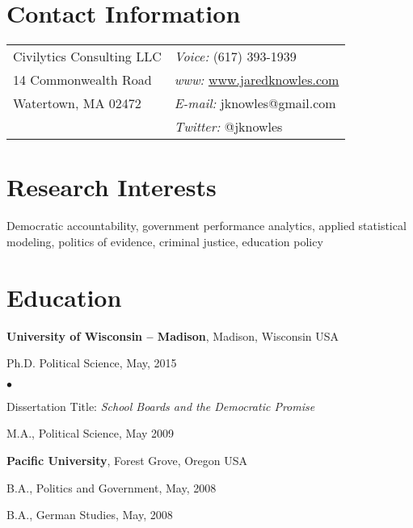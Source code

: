 \documentclass[margin,line]{res}
\newenvironment{list1}{
  \begin{list}{\ding{113}}{%
      \setlength{\itemsep}{0in}
      \setlength{\parsep}{0in} \setlength{\parskip}{0in}
      \setlength{\topsep}{0in} \setlength{\partopsep}{0in} 
      \setlength{\leftmargin}{0.17in}}}{\end{list}}
\newenvironment{list2}{
  \begin{list}{$\bullet$}{%
      \setlength{\itemsep}{0in}
      \setlength{\parsep}{0in} \setlength{\parskip}{0in}
      \setlength{\topsep}{0in} \setlength{\partopsep}{0in} 
      \setlength{\leftmargin}{0.2in}}}{\end{list}}
\begin{document}

\begin{resume}
\section{\sc Contact Information}
\vspace{.05in}
\begin{tabular}{@{}p{2.75in}p{2.75in}}
Civilytics Consulting LLC & {\it Voice:}  (617) 393-1939 \\            
14 Commonwealth Road & {\it www:} \url{www.jaredknowles.com} \\           
Watertown, MA 02472 & {\it E-mail:}  jknowles@gmail.com\\       
 & {\it Twitter:} @jknowles      \\   
\end{tabular}

\section{\sc Research Interests}
Democratic accountability, government performance analytics, applied statistical 
modeling, politics of evidence, criminal justice, education policy

\section{\sc Education}
{\bf University of Wisconsin -- Madison}, Madison, Wisconsin USA\\
\vspace*{-.1in}
\begin{list1}
\item[] Ph.D. Political Science, May, 2015
\begin{list2}
\vspace*{.05in}
\item Dissertation Title: \emph {School Boards and the Democratic Promise} 
\end{list2}
\vspace*{.05in}
\item[] M.A., Political Science,  May 2009
\end{list1}

{\bf Pacific University}, Forest Grove, Oregon USA\\
\vspace*{-.1in}
\begin{list1}
\item[] B.A., Politics and Government,  May, 2008
\item[] B.A., German Studies, May, 2008
\end{list1}



\end{resume}
\end{document}
